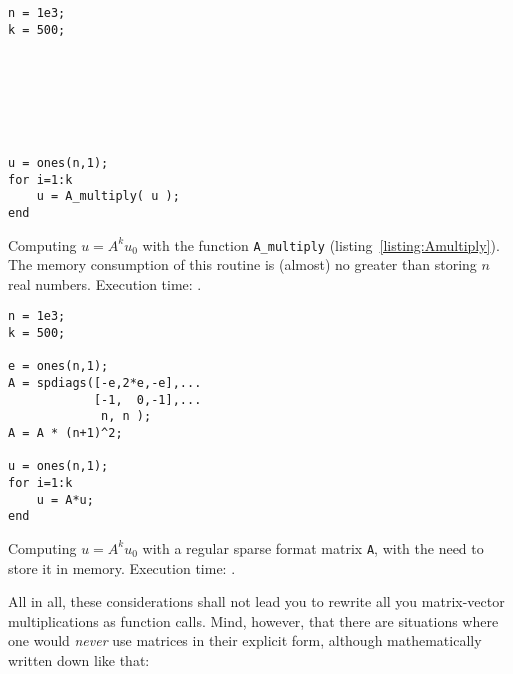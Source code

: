 \hfill
\begin{minipage}[t]{.45\textwidth}
\begin{lstlisting}[framerule=1pt]
n = 1e3;
k = 500;







u = ones(n,1);
for i=1:k
    u = A_multiply( u );
end
\end{lstlisting}
Computing $u = A^ku_0$ with the function \lstinline!A_multiply!
(listing~\ref{listing:Amultiply}). The memory consumption of this routine is
(almost) no greater than storing $n$ real numbers. Execution time:
.
\end{minipage}
\hfill
\begin{minipage}[t]{.45\textwidth}
\begin{lstlisting}[framerule=1pt]
n = 1e3;
k = 500;

e = ones(n,1);
A = spdiags([-e,2*e,-e],...
            [-1,  0,-1],...
             n, n );
A = A * (n+1)^2;

u = ones(n,1);
for i=1:k
    u = A*u;
end
\end{lstlisting}
Computing $u = A^ku_0$ with a regular sparse format matrix \lstinline!A!, with the need to store it in memory. Execution time: .
\end{minipage}
\hfill

All in all, these considerations shall not lead you to rewrite all you
matrix-vector multiplications as function calls. Mind, however, that there are
situations where one would \emph{never} use matrices in their explicit form,
although mathematically written down like that:

